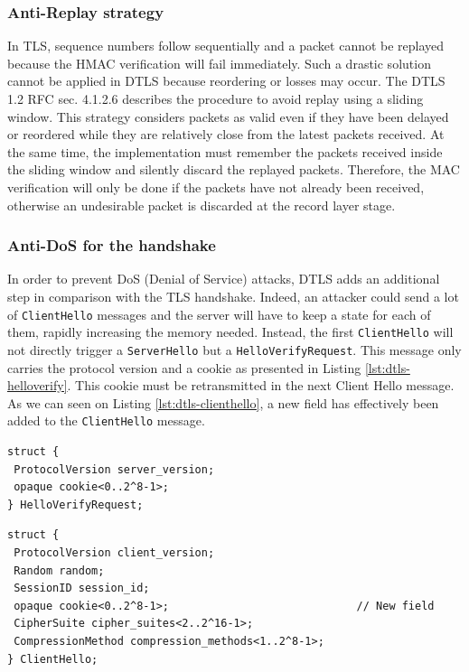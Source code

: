 \subsubsection{Anti-Replay strategy}

In TLS, sequence numbers follow sequentially and a packet cannot be replayed because the HMAC verification will fail immediately. Such a drastic solution cannot be applied in DTLS because reordering or losses may occur. The DTLS 1.2 RFC \cite{rfc6347} sec. 4.1.2.6 describes the procedure to avoid replay using a sliding window. This strategy considers packets as valid even if they have been delayed or reordered while they are relatively close from the latest packets received. At the same time, the implementation must remember the packets received inside the sliding window and silently discard the replayed packets. Therefore, the MAC verification will only be done if the packets have not already been received, otherwise an undesirable packet is discarded at the record layer stage.

\subsubsection{Anti-DoS for the handshake}

In order to prevent DoS (Denial of Service) attacks, DTLS adds an additional step in comparison with the TLS handshake. Indeed, an attacker could send a lot of \texttt{ClientHello} messages and the server will have to keep a state for each of them, rapidly increasing the memory needed. Instead, the first \texttt{ClientHello} will not directly trigger a \texttt{ServerHello} but a \texttt{HelloVerifyRequest}. This message only carries the protocol version and a cookie as presented in Listing \ref{lst:dtls-helloverify}. This cookie must be retransmitted in the next Client Hello message. As we can seen on Listing \ref{lst:dtls-clienthello}, a new field has effectively been added to the \texttt{ClientHello} message.

\begin{lstlisting}[caption=DTLS HelloVerifyRequest message, label=lst:dtls-helloverify]
struct {
 ProtocolVersion server_version;
 opaque cookie<0..2^8-1>;
} HelloVerifyRequest;
\end{lstlisting}


\begin{lstlisting}[caption=DTLS ClientHello adapted message, label=lst:dtls-clienthello]
struct {
 ProtocolVersion client_version;
 Random random;
 SessionID session_id;
 opaque cookie<0..2^8-1>;                             // New field
 CipherSuite cipher_suites<2..2^16-1>;
 CompressionMethod compression_methods<1..2^8-1>;
} ClientHello;
\end{lstlisting}

